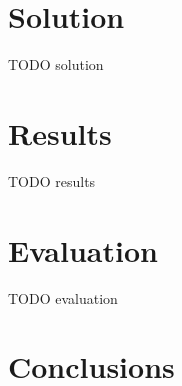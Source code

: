 \documentclass[10pt,a4paper]{article}
\begin{document}
\section{Solution}
    TODO solution
\section{Results}
    TODO results
\section{Evaluation}
    TODO evaluation

\section{Conclusions}


\end{document}
